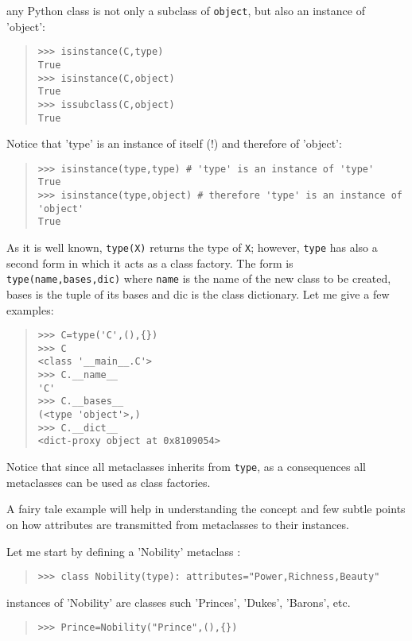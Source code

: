 \documentclass[10pt,english]{article}
\begin{document}
any Python class is not only a subclass of \texttt{object}, but also
an instance of 'object':
\begin{quote}
\begin{verbatim}>>> isinstance(C,type)
True
>>> isinstance(C,object) 
True
>>> issubclass(C,object) 
True\end{verbatim}
\end{quote}

Notice that 'type' is an instance of itself (!) and therefore of 'object':
\begin{quote}
\begin{verbatim}>>> isinstance(type,type) # 'type' is an instance of 'type'
True
>>> isinstance(type,object) # therefore 'type' is an instance of 'object'
True\end{verbatim}
\end{quote}

As it is well known, \texttt{type(X)} returns the type of \texttt{X}; however, 
\texttt{type} has also a second form in which it acts as a class factory.
The form is \texttt{type(name,bases,dic)} where \texttt{name} is the name of
the new class to be created, bases is the tuple of its bases and dic
is the class dictionary. Let me give a few examples:
\begin{quote}
\begin{verbatim}>>> C=type('C',(),{})
>>> C
<class '__main__.C'>
>>> C.__name__
'C'
>>> C.__bases__
(<type 'object'>,)
>>> C.__dict__
<dict-proxy object at 0x8109054>\end{verbatim}
\end{quote}

Notice that since all metaclasses inherits from \texttt{type}, as a consequences
all metaclasses can be used as class factories.

A fairy tale example will help in understanding the concept
and few subtle points on how attributes are transmitted from metaclasses
to their instances.

Let me start by defining a 'Nobility' metaclass :
\begin{quote}
\begin{verbatim}>>> class Nobility(type): attributes="Power,Richness,Beauty"\end{verbatim}
\end{quote}

instances of 'Nobility' are classes such 'Princes', 'Dukes', 'Barons', etc.
\begin{quote}
\begin{verbatim}>>> Prince=Nobility("Prince",(),{})\end{verbatim}
\end{quote}
\end{document}
